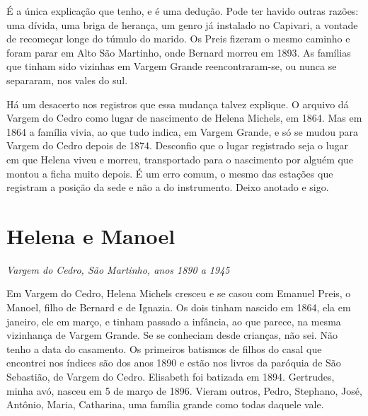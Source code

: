 \documentclass[
  brazilian,
  11pt,
  openany]{book}
\begin{document}
É a única explicação que tenho, e é uma dedução. Pode ter havido outras
razões: uma dívida, uma briga de herança, um genro já instalado no
Capivari, a vontade de recomeçar longe do túmulo do marido. Os Preis
fizeram o mesmo caminho e foram parar em Alto São Martinho, onde Bernard
morreu em 1893. As famílias que tinham sido vizinhas em Vargem Grande
reencontraram-se, ou nunca se separaram, nos vales do sul.

Há um desacerto nos registros que essa mudança talvez explique. O
arquivo dá Vargem do Cedro como lugar de nascimento de Helena Michels,
em 1864. Mas em 1864 a família vivia, ao que tudo indica, em Vargem
Grande, e só se mudou para Vargem do Cedro depois de 1874. Desconfio que
o lugar registrado seja o lugar em que Helena viveu e morreu,
transportado para o nascimento por alguém que montou a ficha muito
depois. É um erro comum, o mesmo das estações que registram a posição da
sede e não a do instrumento. Deixo anotado e sigo.

\section{Helena e Manoel}\label{helena-e-manoel}

\emph{Vargem do Cedro, São Martinho, anos 1890 a 1945}

Em Vargem do Cedro, Helena Michels cresceu e se casou com Emanuel Preis,
o Manoel, filho de Bernard e de Ignazia. Os dois tinham nascido em 1864,
ela em janeiro, ele em março, e tinham passado a infância, ao que
parece, na mesma vizinhança de Vargem Grande. Se se conheciam desde
crianças, não sei. Não tenho a data do casamento. Os primeiros batismos
de filhos do casal que encontrei nos índices são dos anos 1890 e estão
nos livros da paróquia de São Sebastião, de Vargem do Cedro. Elisabeth
foi batizada em 1894. Gertrudes, minha avó, nasceu em 5 de março de
1896. Vieram outros, Pedro, Stephano, José, Antônio, Maria, Catharina,
uma família grande como todas daquele vale.
\end{document}
